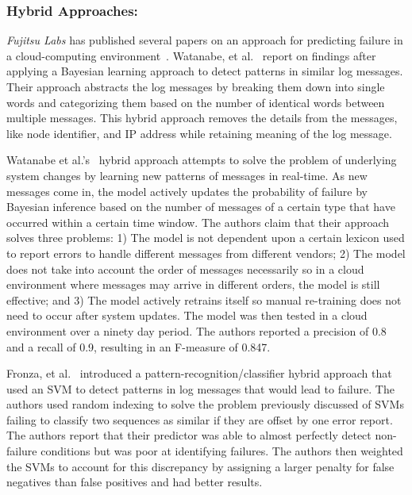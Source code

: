 \subsubsection{Hybrid Approaches:}
\emph{Fujitsu Labs} has published several papers on an approach for predicting
failure in a cloud-computing
environment~\cite{sonoda2012,watanabe2012,watanabe2014}.  Watanabe, et
al.~\cite{watanabe2014, watanabe2012} report on findings after applying a
Bayesian learning approach to detect patterns in similar log messages.  Their
approach abstracts the log messages by breaking them down into single words and
categorizing them based on the number of identical words between multiple
messages.  This hybrid approach removes the details from the messages, like
node identifier, and IP address while retaining meaning of the log message.

Watanabe et al.'s~\cite{watanabe2014} hybrid approach attempts to solve the
problem of underlying system changes by learning new patterns of messages in
real-time.  As new messages come in, the model actively updates the probability
of failure by Bayesian inference based on the number of messages of a certain
type that have occurred within a certain time window.  The authors claim that
their approach solves three problems: 1)  The model is not dependent upon a
certain lexicon used to report errors to handle different messages from
different vendors; 2) The model does not take into account the order of
messages necessarily so in a cloud environment where messages may arrive in
different orders, the model is still effective; and 3)  The model actively
retrains itself so manual re-training does not need to occur after system
updates.  The model was then tested in a cloud environment over a ninety day
period.  The authors reported a precision of 0.8 and a recall of 0.9, resulting
in an F-measure of 0.847.  

Fronza, et al.~\cite{fronza2013} introduced a pattern-recognition/classifier
hybrid approach that used an SVM to detect patterns in log messages that would
lead to failure.  The authors used random indexing to solve the problem
previously discussed of SVMs failing to classify two sequences as similar if
they are offset by one error report.  The authors report that their predictor
was able to almost perfectly detect non-failure conditions but was poor at
identifying failures.  The authors then weighted the SVMs to account for this
discrepancy by assigning a larger penalty for false negatives than false
positives and had better results.


